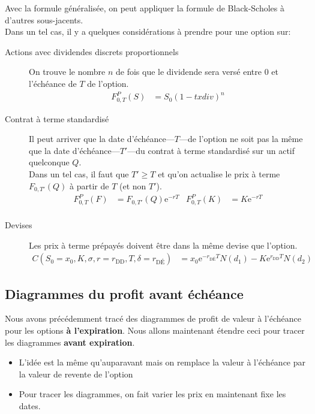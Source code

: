 \documentclass[10pt, french]{article}
\begin{document}
\begin{multicols*}{2}
Avec la formule généralisée, on peut appliquer la formule de Black-Scholes à d'autres sous-jacents.\\ 
Dans un tel cas, il y a quelques considérations à prendre pour une option sur:
\begin{description}
	\item[Actions avec dividendes discrets proportionnels]	On trouve le nombre $n$ de fois que le dividende sera versé entre $0$ et l'échéance de $T$ de l'option.
		\begin{align*}
		F^{P}_{0, T}(S)
		&=	S_{0} (1 - txdiv)^{n}
		\end{align*}
	\item[Contrat à terme standardisé]	Il peut arriver que la date d'échéance---$T$---de l'option ne soit pas la même que la date d'échéance---$T'$---du contrat à terme standardisé sur un actif quelconque $Q$. \\
			Dans un tel cas, il faut que $T' \ge T$ et qu'on actualise le prix à terme $F_{0, T'}(Q)$ à partir de $T$ (et non $T'$).
			\begin{align*}
			F^{P}_{0, T}(F)	
			&=	F_{0, T'}(Q) \textrm{e}^{-rT}	&
			F^{P}_{0, T}(K)
			&=	K \textrm{e}^{-rT}	\\
			\end{align*}
	\item[Devises]	Les prix à terme prépayés doivent être dans la même devise que l'option.
		\begin{align*}
		C(S_{0} = x_{0}, K, \sigma, r = r_{\text{DD}}, T, \delta = r_{\text{DÉ}})
		&=	x_{0} \textrm{e}^{-r_{\text{DÉ}} T}N(d_{1}) - K \textrm{e}^{r_{\text{DD}}T} N(d_{2})	
		\end{align*}
\end{description}




\columnbreak

\subsection{Diagrammes du profit avant échéance}
Nous avons précédemment tracé des diagrammes de profit de valeur à l'échéance pour les options \textbf{à l'expiration}. Nous allons maintenant étendre ceci pour tracer les diagrammes \textbf{avant expiration}.
\begin{itemize}
	\item	L'idée est la même qu'auparavant mais on remplace la valeur à l'échéance par la valeur de revente de l'option
	\item	Pour tracer les diagrammes, on fait varier les prix en maintenant fixe les dates.
\end{itemize}


\end{multicols*}
\end{document}
